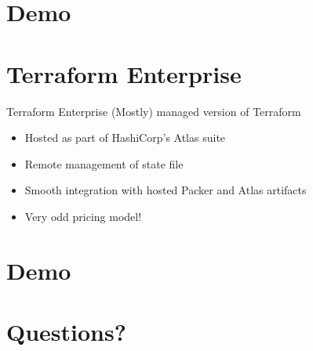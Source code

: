 \documentclass[12pt]{beamer}
\begin{document}
\section{Demo}

\section{Terraform Enterprise}

\begin{frame}{Terraform Enterprise}
  (Mostly) managed version of Terraform
  \begin{itemize}
  \item Hosted as part of HashiCorp's Atlas suite
  \item Remote management of state file
  \item Smooth integration with hosted Packer and Atlas artifacts
  \item Very odd pricing model!
  \end{itemize}
\end{frame}

\section{Demo}

\section{Questions?}
\end{document}
